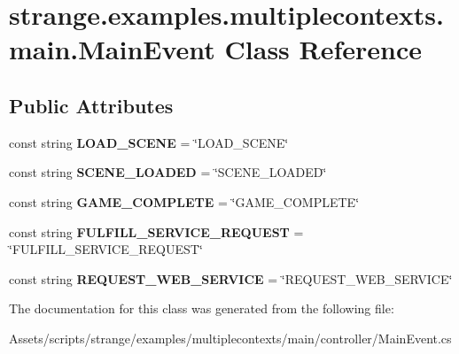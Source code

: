 \hypertarget{classstrange_1_1examples_1_1multiplecontexts_1_1main_1_1_main_event}{\section{strange.\-examples.\-multiplecontexts.\-main.\-Main\-Event Class Reference}
\label{classstrange_1_1examples_1_1multiplecontexts_1_1main_1_1_main_event}
}
\subsection*{Public Attributes}
\begin{DoxyCompactItemize}
\item 
\hypertarget{classstrange_1_1examples_1_1multiplecontexts_1_1main_1_1_main_event_ae9c67eede7f248ef7bd4f9c642064490}{const string {\bfseries L\-O\-A\-D\-\_\-\-S\-C\-E\-N\-E} = \char`\"{}L\-O\-A\-D\-\_\-\-S\-C\-E\-N\-E\char`\"{}}\label{classstrange_1_1examples_1_1multiplecontexts_1_1main_1_1_main_event_ae9c67eede7f248ef7bd4f9c642064490}

\item 
\hypertarget{classstrange_1_1examples_1_1multiplecontexts_1_1main_1_1_main_event_a07d981127c1bd221df95303ccc1f03cb}{const string {\bfseries S\-C\-E\-N\-E\-\_\-\-L\-O\-A\-D\-E\-D} = \char`\"{}S\-C\-E\-N\-E\-\_\-\-L\-O\-A\-D\-E\-D\char`\"{}}\label{classstrange_1_1examples_1_1multiplecontexts_1_1main_1_1_main_event_a07d981127c1bd221df95303ccc1f03cb}

\item 
\hypertarget{classstrange_1_1examples_1_1multiplecontexts_1_1main_1_1_main_event_a89dbf8d6b476bfeac0b9370db1cc97cd}{const string {\bfseries G\-A\-M\-E\-\_\-\-C\-O\-M\-P\-L\-E\-T\-E} = \char`\"{}G\-A\-M\-E\-\_\-\-C\-O\-M\-P\-L\-E\-T\-E\char`\"{}}\label{classstrange_1_1examples_1_1multiplecontexts_1_1main_1_1_main_event_a89dbf8d6b476bfeac0b9370db1cc97cd}

\item 
\hypertarget{classstrange_1_1examples_1_1multiplecontexts_1_1main_1_1_main_event_a4af9bb2da93c2c92dd2bfadfb8c9e4e3}{const string {\bfseries F\-U\-L\-F\-I\-L\-L\-\_\-\-S\-E\-R\-V\-I\-C\-E\-\_\-\-R\-E\-Q\-U\-E\-S\-T} = \char`\"{}F\-U\-L\-F\-I\-L\-L\-\_\-\-S\-E\-R\-V\-I\-C\-E\-\_\-\-R\-E\-Q\-U\-E\-S\-T\char`\"{}}\label{classstrange_1_1examples_1_1multiplecontexts_1_1main_1_1_main_event_a4af9bb2da93c2c92dd2bfadfb8c9e4e3}

\item 
\hypertarget{classstrange_1_1examples_1_1multiplecontexts_1_1main_1_1_main_event_acf655dd9ec88a0895af74fed94e17808}{const string {\bfseries R\-E\-Q\-U\-E\-S\-T\-\_\-\-W\-E\-B\-\_\-\-S\-E\-R\-V\-I\-C\-E} = \char`\"{}R\-E\-Q\-U\-E\-S\-T\-\_\-\-W\-E\-B\-\_\-\-S\-E\-R\-V\-I\-C\-E\char`\"{}}\label{classstrange_1_1examples_1_1multiplecontexts_1_1main_1_1_main_event_acf655dd9ec88a0895af74fed94e17808}

\end{DoxyCompactItemize}


The documentation for this class was generated from the following file\-:\begin{DoxyCompactItemize}
\item 
Assets/scripts/strange/examples/multiplecontexts/main/controller/Main\-Event.\-cs\end{DoxyCompactItemize}
